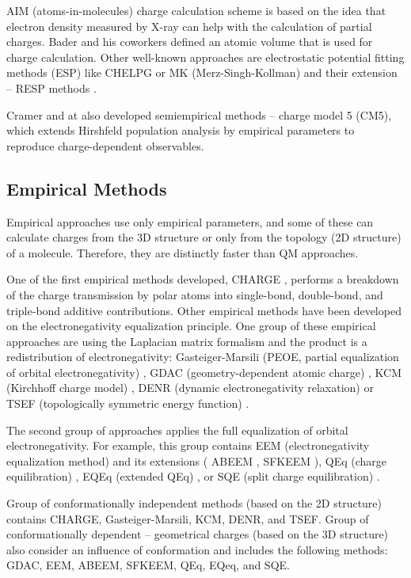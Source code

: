 AIM (atoms-in-molecules) charge calculation scheme is based on the idea that
electron density measured by X-ray can help with the calculation of partial
charges. Bader and his coworkers \cite{Bader1985, Bader1991} defined an atomic
volume that is used for charge calculation. Other well-known approaches are
electrostatic potential fitting methods (ESP) like CHELPG \cite{Breneman1990}
or MK (Merz-Singh-Kollman) \cite{Besler1990} and their extension -- RESP
methods \cite{Bayly1992}.

Cramer and at \cite{Marenich2009} also developed semiempirical methods -- charge
model 5 (CM5), which extends Hirshfeld population analysis by empirical
parameters to reproduce charge-dependent observables. 

\subsection{Empirical Methods}

Empirical approaches use only empirical parameters, and some of these can
calculate charges from the 3D structure or only from the topology (2D structure)
of a molecule. Therefore, they are distinctly faster than QM approaches. 

One of the first empirical methods developed, CHARGE \cite{Abraham2004}, performs a breakdown
of the charge transmission by polar atoms into single-bond, double-bond, and 
triple-bond additive contributions. Other empirical methods have been developed
on the electronegativity equalization principle. One group of these empirical
approaches are using the Laplacian matrix formalism and the product is
a redistribution of electronegativity: Gasteiger-Marsili (PEOE, partial
equalization of orbital electronegativity) \cite{Gasteiger1980},
GDAC (geometry-dependent atomic charge) \cite{Cho2001}, KCM (Kirchhoff charge
model) \cite{Oliferenko2006}, DENR (dynamic electronegativity
relaxation) \cite{Shulga2008} or TSEF (topologically symmetric energy
function) \cite{Shulga2008}.

The second group of approaches applies the full equalization of orbital
electronegativity. For example, this group contains EEM (electronegativity
equalization method) \cite{Mortier1986} and its extensions (
ABEEM \cite{Wilmer2012}, SFKEEM \cite{Chaves2006}), QEq (charge
equilibration) \cite{Rappe1991}, EQEq (extended QEq) \cite{Wilmer2012}, or
SQE (split charge equilibration) \cite{Nistor2006}.

Group of conformationally independent methods (based on the 2D structure)
contains CHARGE, Gasteiger-Marsili, KCM, DENR, and TSEF. Group of
conformationally dependent -- geometrical charges (based on the 3D structure)
also consider an influence of conformation and includes the following methods:
GDAC, EEM, ABEEM, SFKEEM, QEq, EQeq, and SQE.

